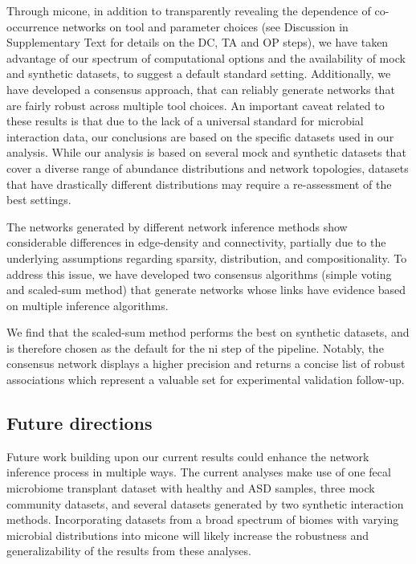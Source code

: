\documentclass[letterpaper,12pt]{article}
\begin{document}
  Through \ac{micone}, in addition to transparently revealing the dependence of co-occurrence networks on tool and parameter choices (see Discussion in Supplementary Text for details on the DC, TA and OP steps), we have taken advantage of our spectrum of computational options and the availability of mock and synthetic datasets, to suggest a default standard setting.
  Additionally, we have developed a consensus approach, that can reliably generate networks that are fairly robust across multiple tool choices.
  An important caveat related to these results is that due to the lack of a universal standard for microbial interaction data, our conclusions are based on the specific datasets used in our analysis.
  While our analysis is based on several mock and synthetic datasets that cover a diverse range of abundance distributions and network topologies, datasets that have drastically different distributions may require a re-assessment of the best settings.

  The networks generated by different network inference methods show considerable differences in edge-density and connectivity, partially due to the underlying assumptions regarding sparsity, distribution, and compositionality.
  To address this issue, we have developed two consensus algorithms (simple voting and scaled-sum method) that generate networks whose links have evidence based on multiple inference algorithms.

 We find that the scaled-sum method performs the best on synthetic datasets, and is therefore chosen as the default for the \ac{ni} step of the pipeline.
 Notably, the consensus network displays a higher precision and returns a concise list of robust associations which represent a valuable set for experimental validation follow-up.

  \subsection*{Future directions}

  Future work building upon our current results could enhance the network inference process in multiple ways.
  The current analyses make use of one fecal microbiome transplant dataset with healthy and ASD samples, three mock community datasets, and several datasets generated by two synthetic interaction methods.
  Incorporating datasets from a broad spectrum of biomes with varying microbial distributions into \ac{micone} will likely increase the robustness and generalizability of the results from these analyses.
\end{document}
